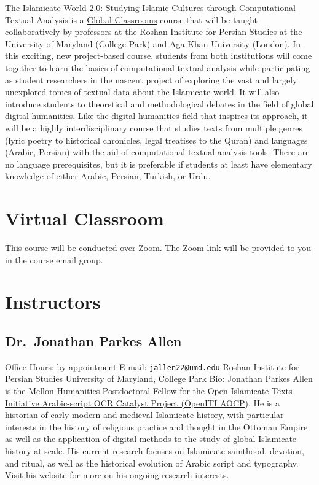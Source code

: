 \documentclass[
]{book}
\begin{document}
The Islamicate World 2.0: Studying Islamic Cultures through Computational Textual Analysis is a \href{https://globalmaryland.umd.edu/content/global-classrooms}{Global Classrooms} course that will be taught collaboratively by professors at the Roshan Institute for Persian Studies at the University of Maryland (College Park) and Aga Khan University (London). In this exciting, new project-based course, students from both institutions will come together to learn the basics of computational textual analysis while participating as student researchers in the nascent project of exploring the vast and largely unexplored tomes of textual data about the Islamicate world. It will also introduce students to theoretical and methodological debates in the field of global digital humanities. Like the digital humanities field that inspires its approach, it will be a highly interdisciplinary course that studies texts from multiple genres (lyric poetry to historical chronicles, legal treatises to the Quran) and languages (Arabic, Persian) with the aid of computational textual analysis tools. There are no language prerequisites, but it is preferable if students at least have elementary knowledge of either Arabic, Persian, Turkish, or Urdu.

\hypertarget{virtual-classroom}{%
\section{Virtual Classroom}\label{virtual-classroom}}

This course will be conducted over Zoom. The Zoom link will be provided to you in the course email group.

\hypertarget{instructors}{%
\section{Instructors}\label{instructors}}

\hypertarget{dr.-jonathan-parkes-allen}{%
\subsection{Dr.~Jonathan Parkes Allen}\label{dr.-jonathan-parkes-allen}}

Office Hours: by appointment
E-mail: \href{mailto:jallen22@umd.edu}{\nolinkurl{jallen22@umd.edu}}
Roshan Institute for Persian Studies
University of Maryland, College Park
Bio: Jonathan Parkes Allen is the Mellon Humanities Postdoctoral Fellow for the \href{https://medium.com/@openiti/openiti-aocp-9802865a6586}{Open Islamicate Texts Initiative Arabic-script OCR Catalyst Project (OpenITI AOCP)}. He is a historian of early modern and medieval Islamicate history, with particular interests in the history of religious practice and thought in the Ottoman Empire as well as the application of digital methods to the study of global Islamicate history at scale. His current research focuses on Islamicate sainthood, devotion, and ritual, as well as the historical evolution of Arabic script and typography. Visit his website for more on his ongoing research interests.
\end{document}
